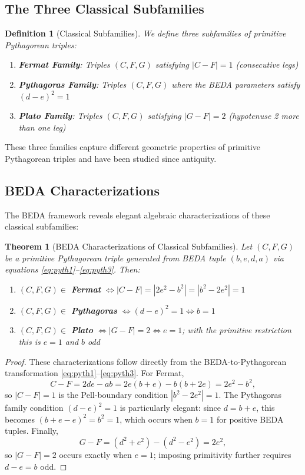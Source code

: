 \documentclass[12pt]{article}
\newtheorem{theorem}{Theorem}
\newtheorem{definition}{Definition}
\begin{document}
\subsection{The Three Classical Subfamilies}

\begin{definition}[Classical Subfamilies]\label{def:classical}
We define three subfamilies of primitive Pythagorean triples:

\begin{enumerate}
\item \textbf{Fermat Family}: Triples $(C, F, G)$ satisfying $|C - F| = 1$ (consecutive legs)
\item \textbf{Pythagoras Family}: Triples $(C, F, G)$ where the BEDA parameters satisfy $(d - e)^2 = 1$
\item \textbf{Plato Family}: Triples $(C, F, G)$ satisfying $|G - F| = 2$ (hypotenuse 2 more than one leg)
\end{enumerate}
\end{definition}

These three families capture different geometric properties of primitive Pythagorean triples and have been studied since antiquity.

\subsection{BEDA Characterizations}

The BEDA framework reveals elegant algebraic characterizations of these classical subfamilies:

\begin{theorem}[BEDA Characterizations of Classical Subfamilies]\label{thm:classical_beda}
Let $(C, F, G)$ be a primitive Pythagorean triple generated from BEDA tuple $(b, e, d, a)$ via equations \eqref{eq:pyth1}--\eqref{eq:pyth3}. Then:

\begin{enumerate}
\item $(C, F, G) \in$ \textbf{Fermat} $\iff |C - F| = |2e^2-b^2| = |b^2-2e^2| = 1$
\item $(C, F, G) \in$ \textbf{Pythagoras} $\iff (d - e)^2 = 1 \iff b = 1$
\item $(C, F, G) \in$ \textbf{Plato} $\iff |G - F| = 2 \iff e = 1$; with the primitive restriction this is $e=1$ and $b$ odd
\end{enumerate}
\end{theorem}

\begin{proof}
These characterizations follow directly from the BEDA-to-Pythagorean transformation \eqref{eq:pyth1}--\eqref{eq:pyth3}. For Fermat,
\[
C-F = 2de-ab = 2e(b+e)-b(b+2e)=2e^2-b^2,
\]
so $|C-F|=1$ is the Pell-boundary condition $|b^2-2e^2|=1$. The Pythagoras family condition $(d-e)^2 = 1$ is particularly elegant: since $d = b + e$, this becomes $(b+e-e)^2 = b^2 = 1$, which occurs when $b = 1$ for positive BEDA tuples. Finally,
\[
G-F=(d^2+e^2)-(d^2-e^2)=2e^2,
\]
so $|G-F|=2$ occurs exactly when $e=1$; imposing primitivity further requires $d-e=b$ odd.
\end{proof}
\end{document}
